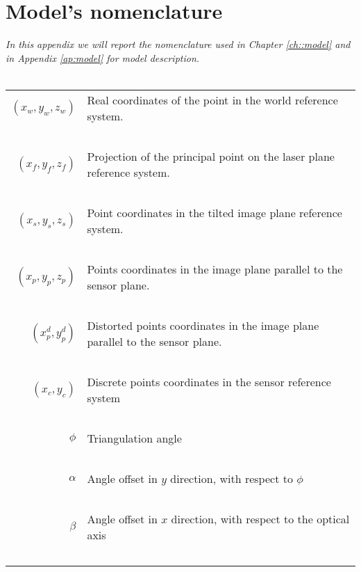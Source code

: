 \chapter{Model's nomenclature}
\label{ap:nomen}

\textit{In this appendix we will report the nomenclature used in Chapter \ref{ch::model} and in Appendix \ref{ap:model} for model description.} \\

~\\

\begin{longtable}{ r p{11cm} }
  $\left( x_w, y_w, z_w \right)$        & Real coordinates of the point in the world reference system.                  \\~\\   
  $\left( x_f, y_f, z_f \right)$        & Projection of the principal point on the laser plane reference system.        \\~\\ 
  $\left( x_s, y_s, z_s \right)$        & Point coordinates in the tilted image plane reference system.                 \\~\\ 
  $\left( x_p, y_p, z_p \right)$        & Points coordinates in the image plane parallel to the sensor plane.           \\~\\ 
  $\left( x_p^d, y_p^d \right)$         & Distorted points coordinates in the image plane parallel to the sensor plane. \\~\\ 
  $\left( x_c, y_c \right)$             & Discrete points coordinates in the sensor reference system                    \\~\\ 
  $\phi$                                & Triangulation angle                                                           \\~\\ 
  $\alpha$                              & Angle offset in $y$ direction, with respect to $\phi$                         \\~\\ 
  $\beta$                               & Angle offset in $x$ direction, with respect to the optical axis               \\~\\   

\end{longtable}
